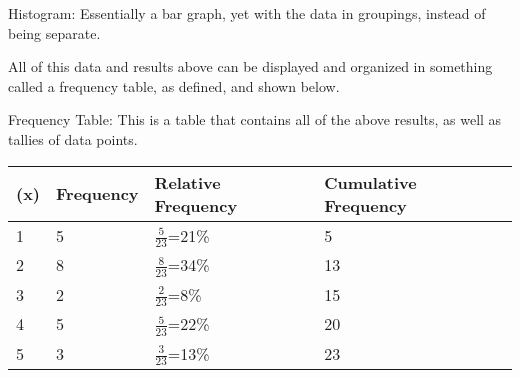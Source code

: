     \begin{definition}
        Histogram: Essentially a bar graph, yet with the data in groupings, instead of being separate.
    \end{definition}
    \begin{center}
    \end{center}
    All of this data and results above can be displayed and organized in something called a frequency table, as defined, and shown below.
    \begin{definition}
        Frequency Table: This is a table that contains all of the above results, as well as tallies of data points.
    \end{definition}
    \begin{center}
        \begin{tabular}{ | l | l | l | l |}
            \hline
            (x) & Frequency & Relative Frequency & Cumulative Frequency \\ \hline
            1 & 5 & $\frac{5}{23}$=21\% & 5 \\ \hline
            2 & 8 & $\frac{8}{23}$=34\% & 13 \\ \hline
            3 & 2 & $\frac{2}{23}$=8\% & 15 \\ \hline
            4 & 5 & $\frac{5}{23}$=22\% & 20 \\ \hline
            5 & 3 & $\frac{3}{23}$=13\% & 23 \\ \hline
        \end{tabular}
    \end{center}
    
